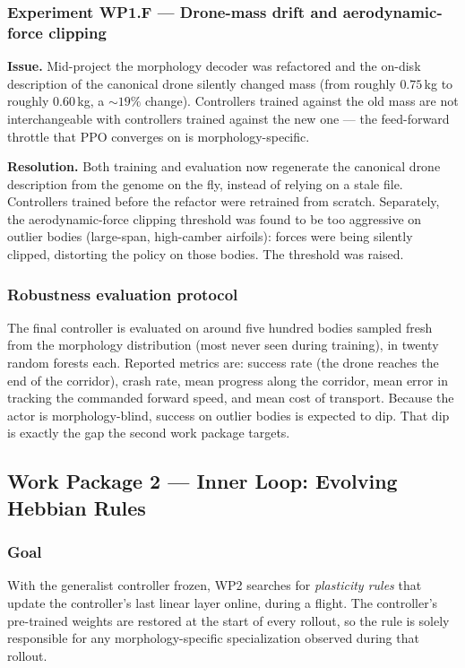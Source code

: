 \documentclass[letterpaper,10pt]{article}
\begin{document}
\subsubsection{Experiment WP1.F — Drone-mass drift and aerodynamic-force clipping}
\textbf{Issue.} Mid-project the morphology decoder was refactored and the on-disk description of the canonical drone silently changed mass (from roughly $0.75$\,kg to roughly $0.60$\,kg, a $\sim 19\%$ change). Controllers trained against the old mass are not interchangeable with controllers trained against the new one --- the feed-forward throttle that PPO converges on is morphology-specific.

\textbf{Resolution.} Both training and evaluation now regenerate the canonical drone description from the genome on the fly, instead of relying on a stale file. Controllers trained before the refactor were retrained from scratch. Separately, the aerodynamic-force clipping threshold was found to be too aggressive on outlier bodies (large-span, high-camber airfoils): forces were being silently clipped, distorting the policy on those bodies. The threshold was raised.

\subsubsection{Robustness evaluation protocol}
The final controller is evaluated on around five hundred bodies sampled fresh from the morphology distribution (most never seen during training), in twenty random forests each. Reported metrics are: success rate (the drone reaches the end of the corridor), crash rate, mean progress along the corridor, mean error in tracking the commanded forward speed, and mean cost of transport. Because the actor is morphology-blind, success on outlier bodies is expected to dip. That dip is exactly the gap the second work package targets.

\subsection{Work Package 2 --- Inner Loop: Evolving Hebbian Rules}

\subsubsection{Goal}
With the generalist controller frozen, WP2 searches for \emph{plasticity rules} that update the controller's last linear layer online, during a flight. The controller's pre-trained weights are restored at the start of every rollout, so the rule is solely responsible for any morphology-specific specialization observed during that rollout.
\end{document}
